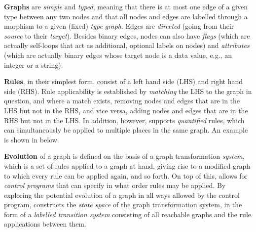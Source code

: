 %
%
%

\textbf{Graphs} are \emph{simple} and \emph{typed}, meaning that there is at most one edge of a given type between any two nodes and that all nodes and edges are labelled through a morphism to a given (fixed) \emph{type graph}. Edges are \emph{directed} (going from their \emph{source} to their \emph{target}). Besides binary edges, nodes can also have \emph{flags} (which are actually self-loops that act as additional, optional labels on nodes) and \emph{attributes} (which are actually binary edges whose target node is a data value, e.g., an integer or a string).

\textbf{Rules}, in their simplest form, consist of a left hand side (LHS) and right hand side (RHS). Rule applicability is established by \emph{matching} the LHS to the graph in question, and where a match exists, removing nodes and edges that are in the LHS but not in the RHS, and vice versa, adding nodes and edges that are in the RHS but not in the LHS. In addition, however, \GROOVE supports \emph{quantified} rules, which can simultaneously be applied to multiple places in the same graph. An example is shown in  below.

\textbf{Evolution} of a graph is defined on the basis of a graph transformation \emph{system}, which is a set of rules applied to a graph at hand, giving rise to a modified graph to which every rule can be applied again, and so forth. On top of this, \GROOVE allows for \emph{control programs} that can specify in what order rules may be applied. By exploring the potential evolution of a graph in all ways allowed by the control program, \GROOVE constructs the \emph{state space} of the graph transformation system, in the form of a \emph{labelled transition system} consisting of all reachable graphs and the rule applications between them.

